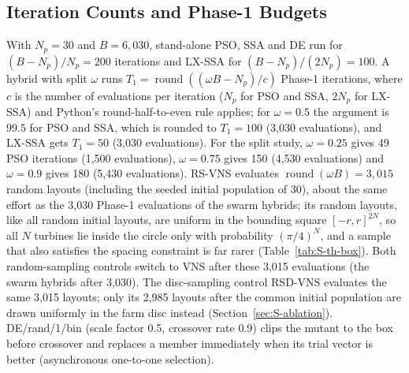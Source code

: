 \documentclass[10pt]{article}
\begin{document}
\subsection{Iteration Counts and Phase-1 Budgets}
\label{sec:S-iter}
With $N_p=30$ and $B=6{,}030$, stand-alone PSO, SSA and DE run for $(B-N_p)/N_p=200$ iterations and LX-SSA for $(B-N_p)/(2N_p)=100$. A hybrid with split $\omega$ runs $T_1=\operatorname{round}((\omega B-N_p)/c)$ Phase-1 iterations, where $c$ is the number of evaluations per iteration ($N_p$ for PSO and SSA, $2N_p$ for LX-SSA) and Python's round-half-to-even rule applies; for $\omega=0.5$ the argument is $99.5$ for PSO and SSA, which is rounded to $T_1=100$ (3,030 evaluations), and LX-SSA gets $T_1=50$ (3,030 evaluations). For the split study, $\omega=0.25$ gives 49 PSO iterations (1,500 evaluations), $\omega=0.75$ gives 150 (4,530 evaluations) and $\omega=0.9$ gives 180 (5,430 evaluations). RS-VNS evaluates $\operatorname{round}(\omega B)=3{,}015$ random layouts (including the seeded initial population of 30), about the same effort as the 3,030 Phase-1 evaluations of the swarm hybrids; its random layouts, like all random initial layouts, are uniform in the bounding square $[-r,r]^{2N}$, so all $N$ turbines lie inside the circle only with probability $(\pi/4)^N$, and a sample that also satisfies the spacing constraint is far rarer (Table~\ref{tab:S-th-box}). Both random-sampling controls switch to VNS after these 3,015 evaluations (the swarm hybrids after 3,030). The disc-sampling control RSD-VNS evaluates the same 3,015 layouts; only its 2,985 layouts after the common initial population are drawn uniformly in the farm disc instead (Section~\ref{sec:S-ablation}). DE/rand/1/bin (scale factor 0.5, crossover rate 0.9) clips the mutant to the box before crossover and replaces a member immediately when its trial vector is better (asynchronous one-to-one selection).
\end{document}
